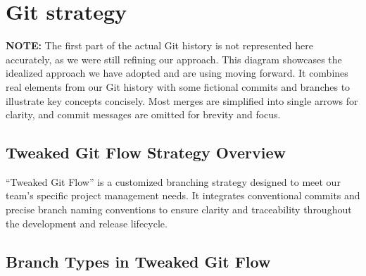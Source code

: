 \section{Git strategy} \label{git_strategy}
	
\noindent \textbf{NOTE:} The first part of the actual Git history is not represented here accurately, as we were still refining our approach. This diagram showcases the idealized approach we have adopted and are using moving forward. It combines real elements from our Git history with some fictional commits and branches to illustrate key concepts concisely. Most merges are simplified into single arrows for clarity, and commit messages are omitted for brevity and focus.

\subsection{Tweaked Git Flow Strategy Overview}

``Tweaked Git Flow'' is a customized branching strategy designed to meet our team's specific project management needs. It integrates conventional commits and precise branch naming conventions to ensure clarity and traceability throughout the development and release lifecycle.

\subsection{Branch Types in Tweaked Git Flow}

